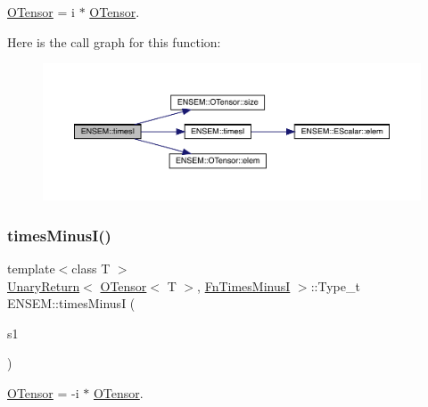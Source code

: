 \mbox{\hyperlink{classENSEM_1_1OTensor}{O\+Tensor}} = i $\ast$ \mbox{\hyperlink{classENSEM_1_1OTensor}{O\+Tensor}}. 

Here is the call graph for this function\+:\nopagebreak
\begin{figure}[H]
\begin{center}
\leavevmode
\includegraphics[width=350pt]{de/d87/group__obstensor_ga014bfcb56266f5301dcc8a1fe479f8b1_cgraph}
\end{center}
\end{figure}
\mbox{\label{group__obstensor_ga2ff1b1b26805ce37116135e8474f4b36}} 
\subsubsection{\texorpdfstring{timesMinusI()}{timesMinusI()}}
{\footnotesize\ttfamily template$<$class T $>$ \\
\mbox{\hyperlink{structENSEM_1_1UnaryReturn}{Unary\+Return}}$<$ \mbox{\hyperlink{classENSEM_1_1OTensor}{O\+Tensor}}$<$ T $>$, \mbox{\hyperlink{structENSEM_1_1FnTimesMinusI}{Fn\+Times\+MinusI}} $>$\+::Type\+\_\+t E\+N\+S\+E\+M\+::times\+MinusI (\begin{DoxyParamCaption}\item[{const \mbox{\hyperlink{classENSEM_1_1OTensor}{O\+Tensor}}$<$ T $>$ \&}]{s1 }\end{DoxyParamCaption})\hspace{0.3cm}{\ttfamily [inline]}}



\mbox{\hyperlink{classENSEM_1_1OTensor}{O\+Tensor}} = -\/i $\ast$ \mbox{\hyperlink{classENSEM_1_1OTensor}{O\+Tensor}}. 

